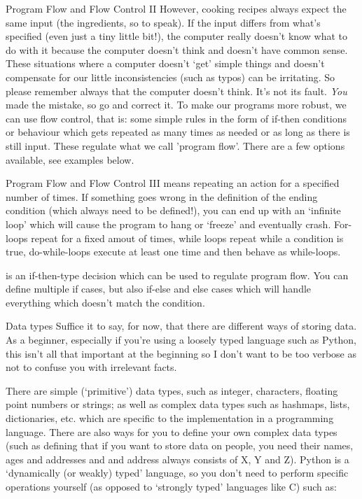 \documentclass[10pt,a4paper]{article}
\begin{document}
\begin{multicols}{3}
\begin{textbox}{Program Flow and Flow Control II}
However, cooking recipes always expect the same input (the ingredients, so to speak). If the input differs from what's specified (even just a tiny little bit!), the computer really doesn't know what to do with it because the computer doesn't think and doesn't have common sense. These situations where a computer doesn't `get' simple things and doesn't compensate for our little inconsistencies (such as typos) can be irritating. So please remember always that the computer doesn't think. It's not its fault. \emph{You} made the mistake, so go and correct it. To make our programs more robust, we can use flow control, that is: some simple rules in the form of if-then conditions or behaviour which gets repeated as many times as needed or as long as there is still input. These regulate what we call 'program flow'. There are a few options available, see examples below.
\end{textbox}

\begin{textbox}{Program Flow and Flow Control III}
 means repeating an action for a specified number of times. If something goes wrong in the definition of the ending condition (which always need to be defined!), you can end up with an `infinite loop' which will cause the program to hang or `freeze' and eventually crash. For-loops repeat for a fixed amout of times, while loops repeat while a condition is true, do-while-loops execute at least one time and then behave as while-loops.

 is an if-then-type decision which can be used to regulate program flow. You can define multiple if cases, but also if-else and else cases which will handle everything which doesn't match the condition.
\end{textbox}

\begin{textbox}{Data types}
Suffice it to say, for now, that there are different ways of storing data. As a beginner, especially if you're using a loosely typed language such as Python, this isn't all that important at the beginning so I don't want to be too verbose as not to confuse you with irrelevant facts.

There are simple (`primitive') data types, such as integer, characters, floating point numbers or strings; as well as complex data types such as hashmaps, lists, dictionaries, etc. which are specific to the implementation in a programming language. There are also ways for you to define your own complex data types (such as defining that if you want to store data on people, you need their names, ages and addresses and and address always consists of X, Y and Z).
Python is a `dynamically (or weakly) typed' language, so you don't need to perform specific operations yourself (as opposed to `strongly typed' languages like C) such as:


\end{textbox}
\end{multicols}
\end{document}
